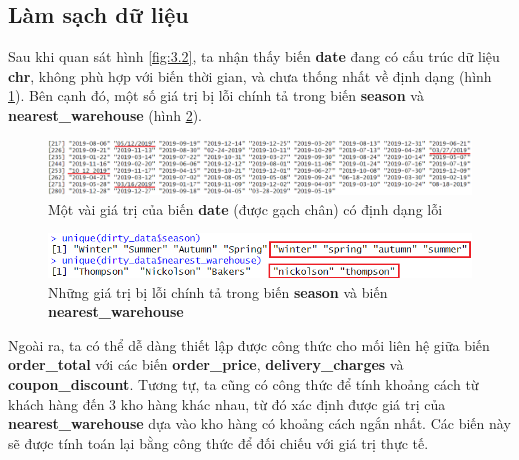 \subsection{Làm sạch dữ liệu}
Sau khi quan sát hình \ref{fig:3.2}, ta nhận thấy biến \textbf{date} đang có cấu trúc dữ liệu \textbf{chr}, không phù hợp với biến thời gian, và chưa thống nhất về định dạng (hình \ref{fig:3.3}). Bên cạnh đó, một số giá trị bị lỗi chính tả trong biến \textbf{season} và \textbf{nearest\_warehouse} (hình \ref{fig:3.4}).
\begin{figure}[!htbp]
    \centering
    \includegraphics[width=1\textwidth]{graphics/Pre_processing_data/f10.PNG}
    \caption{Một vài giá trị của biến \textbf{date} (được gạch chân) có định dạng lỗi}
    \label{fig:3.3}
\end{figure}

\begin{figure}[!htbp]
    \centering
    \includegraphics[width=\textwidth]{graphics/Pre_processing_data/f11.PNG}
    \caption{Những giá trị bị lỗi chính tả trong biến \textbf{season} và biến \textbf{nearest\_warehouse}}
    \label{fig:3.4}
\end{figure}

Ngoài ra, ta có thể dễ dàng thiết lập được công thức cho mối liên hệ giữa biến \textbf{order\_total} với các biến \textbf{order\_price}, \textbf{delivery\_charges} và \textbf{coupon\_discount}. Tương tự, ta cũng có công thức để tính khoảng cách từ khách hàng đến 3 kho hàng khác nhau, từ đó xác định được giá trị của \textbf{nearest\_warehouse} dựa vào kho hàng có khoảng cách ngắn nhất. Các biến này sẽ được tính toán lại bằng công thức để đối chiếu với giá trị thực tế.
